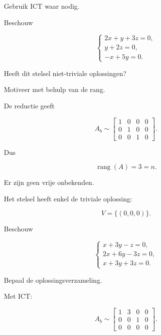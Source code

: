 \documentclass{ximera}
\begin{document}
\begin{oefening}{\oefB\ESS}

Gebruik ICT waar nodig.


\begin{question}

Beschouw

\[
\begin{cases}
2x+y+3z=0,\\
y+2z=0,\\
-x+5y=0.
\end{cases}
\]

Heeft dit stelsel niet-triviale oplossingen?

Motiveer met behulp van de rang.

\begin{oplossing}

De reductie geeft

\[
A_b
\sim
\left[
\begin{array}{ccc|c}
1&0&0&0\\
0&1&0&0\\
0&0&1&0
\end{array}
\right].
\]

Dus

\[
\operatorname{rang}(A)=3=n.
\]

Er zijn geen vrije onbekenden.

Het stelsel heeft enkel de triviale oplossing:

\[
V=\{(0,0,0)\}.
\]

\end{oplossing}

\end{question}


\begin{question}

Beschouw

\[
\begin{cases}
x+3y-z=0,\\
2x+6y-3z=0,\\
x+3y+3z=0.
\end{cases}
\]

Bepaal de oplossingsverzameling.

\begin{oplossing}

Met ICT:

\[
A_b
\sim
\left[
\begin{array}{ccc|c}
1&3&0&0\\
0&0&1&0\\
0&0&0&0
\end{array}
\right].
\]


\end{oplossing}
\end{question}
\end{oefening}
\end{document}
